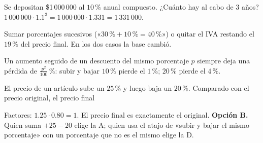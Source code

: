 \begin{ejemplo}
Se depositan \$1\,000\,000 al $10\,\%$ anual compuesto. ¿Cuánto hay al cabo de 3 años?
\solucion $1\,000\,000 \cdot 1.1^3 = 1\,000\,000 \cdot 1.331 = 1\,331\,000$.
\end{ejemplo}

\begin{trampa}
Sumar porcentajes sucesivos («$30\,\% + 10\,\% = 40\,\%$») o quitar el IVA restando el $19\,\%$ del precio final. En los
dos casos la base cambió.
\end{trampa}

\begin{atajo}
Un aumento seguido de un descuento del mismo porcentaje $p$ siempre deja una pérdida de $\tfrac{p^2}{100}\,\%$:
subir y bajar $10\,\%$ pierde el $1\,\%$; $20\,\%$ pierde el $4\,\%$.
\end{atajo}

\begin{reto}
El precio de un artículo sube un $25\,\%$ y luego baja un $20\,\%$. Comparado con el precio original, el precio final
\end{reto}

\begin{retoresuelto}
Factores: $1.25 \cdot 0.80 = 1$. El precio final es exactamente el original. \textbf{Opción B.} Quien suma $+25 - 20$
elige la A; quien usa el atajo de «subir y bajar el mismo porcentaje» con un porcentaje que no es el mismo elige la D.
\end{retoresuelto}

